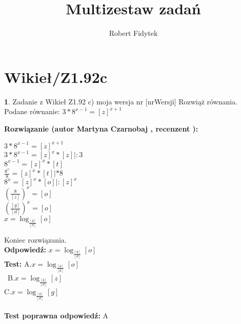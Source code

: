 \documentclass[12pt, a4paper]{article}
\title{Multizestaw zadań}
\author{Robert Fidytek}
\date{}
\theoremstyle{definition} %
\newtheorem{zad}{}
\newcommand{\kategoria}[1]{\section{#1}} %
\newcommand{\zadStart}[1]{\begin{zad}#1\newline} %
\newcommand{\zadStop}{\end{zad}}   %
\newcommand{\rozwStart}[2]{\noindent \textbf{Rozwiązanie (autor #1 , recenzent #2): }\newline} %
\newcommand{\rozwStop}{\newline}                                            %
\newcommand{\odpStart}{\noindent \textbf{Odpowiedź:}\newline}    %
\newcommand{\odpStop}{\newline}                                             %
\newcommand{\testStart}{\noindent \textbf{Test:}\newline} %
\newcommand{\testStop}{\newline} %
\newcommand{\kluczStart}{\noindent \textbf{Test poprawna odpowiedź:}\newline} %
\newcommand{\kluczStop}{\newline} %
\begin{document}
\maketitle

\kategoria{Wikieł/Z1.92c}
\zadStart{Zadanie z Wikieł Z1.92 c) moja wersja nr [nrWersji]}
Rozwiąż równania.\\
Podane równanie: $ 3*8^{x - 1} = [z]^{x + 1} $
\zadStop
\rozwStart{Martyna Czarnobaj}{}
\begin{center}
	$ 3*8^{x - 1} = [z]^{x + 1} $\\
	$ 3*8^{x - 1} = [z]^{x} * [z] |:3 $\\
	$ 8^{x - 1} = [z]^{x} * [t] $\\
	$ \frac{8^{x}}{8} = [z]^{x} * [t] |*8 $\\
	$ 8^{x} = [z]^{x} * [o] |:[z]^{x} $\\
	$ (\frac{8}{[z]})^{x} = [o] $\\
	$ (\frac{[g]}{[d]})^{x} = [o] $\\
	$ x = \log_{\frac{[g]}{[d]}} [o] $\\
\end{center}
Koniec rozwiązania.\\
\rozwStop
\odpStart
 $ x = \log_{\frac{[g]}{[d]}} [o] $\\
\odpStop
\testStart
A.$ x = \log_{\frac{[g]}{[d]}} [o] $\\\
B.$ x = \log_{\frac{[g]}{[d]}} [z] $\\
C.$ x = \log_{\frac{[g]}{[d]}} [g] $\\\\
\testStop
\kluczStart
A
\kluczStop
\end{document}
